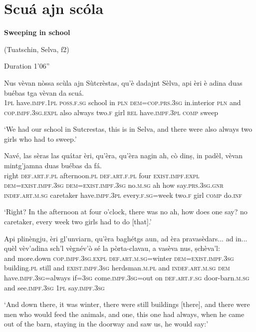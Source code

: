 \section{Scuá ajn scóla}
\textbf{Sweeping in school}


(Tuatschin, Selva, f2)


Duration 1'06''
\bigskip

\begin{linenumbers}
\gll Nus vèvan nòssa scùla ajn Sùtcrèstas, qu’è dadajnt Sèlva, api èri è adina duas buébas tga vèvan da scuá.   \\
  \textsc{1pl} have.\textsc{impf.1pl} \textsc{poss.f.sg} school in \textsc{pln} \textsc{dem=cop.prs.3sg} in.interior \textsc{pln} and \textsc{cop.impf.3sg.expl} also always two.\textsc{f} girl \textsc{rel} have.\textsc{impf.3pl} \textsc{comp} sweep\\
 \end{linenumbers}
 \medskip
\glt `We had our school in Sutcrestas, this is in Selva, and there were also always two girls who had to sweep.'
\medskip

\begin{linenumbers}
\gll   Navé, las sèras las quátar èri, qu'èra, qu’èra nagin ah, cò dinṣ, in padèl, vèvan mintg’jamna duas buébas da fá. \\
     right \textsc{def.art.f.pl} afternoon.\textsc{pl} \textsc{def.art.f.pl} four \textsc{exist.impf.expl} \textsc{dem}=\textsc{exist.impf.3sg} \textsc{dem}=\textsc{exist.impf.3sg} no.\textsc{m.sg} ah how say.\textsc{prs.3sg.gnr} \textsc{indef.art.m.sg} caretaker have.\textsc{impf.3pl} every.\textsc{f.sg}=week two.\textsc{f} girl \textsc{comp} do.\textsc{inf}\\
\end{linenumbers}
\medskip
\glt `Right? In the afternoon at four o’clock, there was no ah, how does one say? no caretaker, every week two girls had to do [that].'
\medskip

\begin{linenumbers}
\gll    Api plinèngju, èri gl’unviarn, qu’èra baghétgs aun, ad èra pravasèdars... ad in... quèl vèv’adina sch’l vègnév’ò sé la pòrta-clavau, a vasèva nus, ṣchèva’l: \\
  and more.down  \textsc{cop.impf.3sg.expl} \textsc{def.art.m.sg}=winter \textsc{dem=exist.impf.3sg} building.\textsc{pl} still and \textsc{exist.impf.3sg} herdsman.\textsc{m.pl} and \textsc{indef.art.m.sg} \textsc{dem} have.\textsc{impf.3sg}=always if=\textsc{3sg} come.\textsc{impf.3sg}=out on \textsc{def.art.f.sg} door-barn.\textsc{m.sg} and see.\textsc{impf.3sg} \textsc{1pl} say.\textsc{impf.3sg} \\
\end{linenumbers}
\medskip
\glt `And down there, it was winter, there were still buildings [there], and there were men who would feed the animals, and one, this one had always, when he came out of the barn, staying in the doorway and saw us, he would say:'
\medskip

